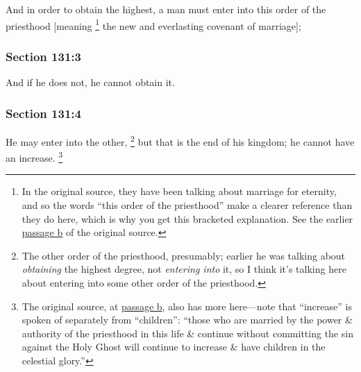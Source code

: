 		And in order to obtain the highest, a man must enter into this order of the priesthood [meaning%
			\footnote{%
				In the original source, they have been talking about marriage for eternity, and so the words ``this order of the priesthood'' make a clearer reference than they do here, which is why you get this bracketed explanation. See the earlier \hyperlink{EMS-1843-JS-16-MAY-1843-WC-b}{passage b} of the original source.
				}
		the new and everlasting covenant of marriage];


	\subsubsection{Section 131:3} %
		\label{DC131-3}

		And if he does not, he cannot obtain it.


	\subsubsection{Section 131:4} %
		\label{DC131-4}

		He may enter into the other,%
			\footnote{%
				The other order of the priesthood, presumably; earlier he was talking about \textit{obtaining} the highest degree, not \textit{entering into} it, so I think it's talking here about entering into some other order of the priesthood.
				}
		but that is the end of his kingdom; he cannot have an increase.%
			\footnote{%
				The original source, at \hyperlink{EMS-1843-JS-16-MAY-1843-WC-b}{passage b}, also has more here---note that ``increase'' is spoken of separately from ``children'': ``those who are married by the power \& authority of the priesthood in this life \& continue without committing the sin against the Holy Ghost will continue to increase \& have children in the celestial glory.''
				}

